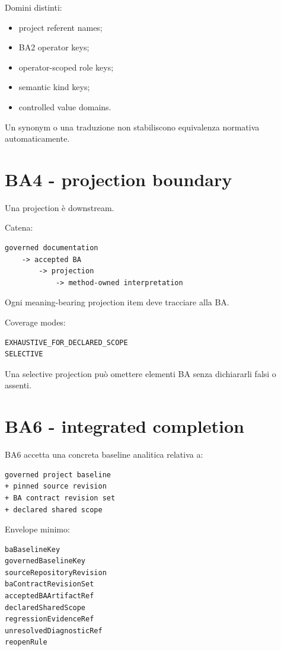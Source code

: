 \documentclass[11pt,a4paper]{article}
\begin{document}
Domini distinti:

\begin{itemize}
\item project referent names;
\item BA2 operator keys;
\item operator-scoped role keys;
\item semantic kind keys;
\item controlled value domains.
\end{itemize}

Un synonym o una traduzione non stabiliscono equivalenza normativa automaticamente.

\section{BA4 - projection boundary}

Una projection è downstream.

Catena:

\begin{lstlisting}
governed documentation
    -> accepted BA
        -> projection
            -> method-owned interpretation
\end{lstlisting}

Ogni meaning-bearing projection item deve tracciare alla BA.

Coverage modes:

\begin{lstlisting}
EXHAUSTIVE_FOR_DECLARED_SCOPE
SELECTIVE
\end{lstlisting}

Una selective projection può omettere elementi BA senza dichiararli falsi o assenti.

\section{BA6 - integrated completion}

BA6 accetta una concreta baseline analitica relativa a:

\begin{lstlisting}
governed project baseline
+ pinned source revision
+ BA contract revision set
+ declared shared scope
\end{lstlisting}

Envelope minimo:

\begin{lstlisting}
baBaselineKey
governedBaselineKey
sourceRepositoryRevision
baContractRevisionSet
acceptedBAArtifactRef
declaredSharedScope
regressionEvidenceRef
unresolvedDiagnosticRef
reopenRule
\end{lstlisting}
\end{document}

